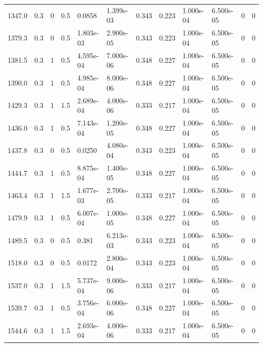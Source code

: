 \documentclass[preview]{standalone}
\begin{document}
{{\begin{tabular}{L{1.2cm}C{1.2cm} C{0.3cm}C{0.5cm} C{1.4cm}C{1.4cm} C{1.4cm}C{1.4cm} C{1.6cm}C{1.6cm} C{1.6cm}C{1.6cm}}
  1347.0  &   0.3  & 0     & 0.5 &  0.0858  & 1.399e-03  &  0.343&   0.223& 1.000e-04 & 6.500e-05   &  0 & 0  \\ 
  1379.3  &   0.3  & 0     & 0.5 &  1.803e-03  & 2.900e-05  &  0.343&   0.223& 1.000e-04 & 6.500e-05   &  0 & 0  \\ 
  1381.5  &   0.3  & 1     & 0.5 &  4.595e-04  & 7.000e-06  &  0.348&   0.227& 1.000e-04 & 6.500e-05   &  0 & 0  \\ 
  1390.0  &   0.3  & 1     & 0.5 &  4.985e-04  & 8.000e-06  &  0.348&   0.227& 1.000e-04 & 6.500e-05   &  0 & 0  \\ 
  1429.3  &   0.3  & 1     & 1.5 &  2.689e-04  & 4.000e-06  &  0.333&   0.217& 1.000e-04 & 6.500e-05   &  0 & 0  \\ 
  1436.0  &   0.3  & 1     & 0.5 &  7.143e-04  & 1.200e-05  &  0.348&   0.227& 1.000e-04 & 6.500e-05   &  0 & 0  \\ 
  1437.8  &   0.3  & 0     & 0.5 &  0.0250  & 4.080e-04  &  0.343&   0.223& 1.000e-04 & 6.500e-05   &  0 & 0  \\ 
  1444.7  &   0.3  & 1     & 0.5 &  8.875e-04  & 1.400e-05  &  0.348&   0.227& 1.000e-04 & 6.500e-05   &  0 & 0  \\ 
  1463.4  &   0.3  & 1     & 1.5 &  1.677e-03  & 2.700e-05  &  0.333&   0.217& 1.000e-04 & 6.500e-05   &  0 & 0  \\ 
  1479.9  &   0.3  & 1     & 0.5 &  6.007e-04  & 1.000e-05  &  0.348&   0.227& 1.000e-04 & 6.500e-05   &  0 & 0  \\ 
  1489.5  &   0.3  & 0     & 0.5 &  0.381  & 6.213e-03  &  0.343&   0.223& 1.000e-04 & 6.500e-05   &  0 & 0  \\ 
  1518.0  &   0.3  & 0     & 0.5 &  0.0172  & 2.800e-04  &  0.343&   0.223& 1.000e-04 & 6.500e-05   &  0 & 0  \\ 
  1537.0  &   0.3  & 1     & 1.5 &  5.737e-04  & 9.000e-06  &  0.333&   0.217& 1.000e-04 & 6.500e-05   &  0 & 0  \\ 
  1539.7  &   0.3  & 1     & 0.5 &  3.756e-04  & 6.000e-06  &  0.348&   0.227& 1.000e-04 & 6.500e-05   &  0 & 0  \\ 
  1544.6  &   0.3  & 1     & 1.5 &  2.693e-04  & 4.000e-06  &  0.333&   0.217& 1.000e-04 & 6.500e-05   &  0 & 0  \\ 
\hline 
\end{tabular} 

}}
\end{document}
